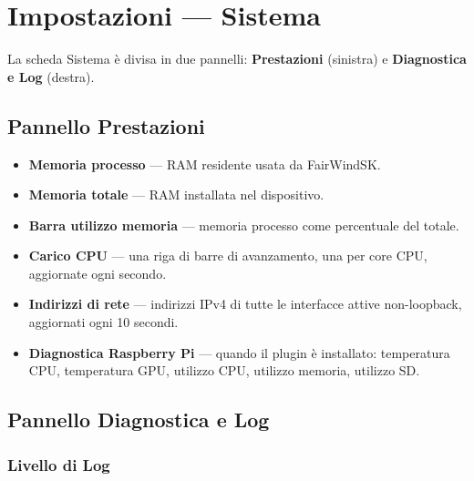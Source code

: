 \chapter{Impostazioni --- Sistema}
\label{ch:impostazioni-sistema}

La scheda Sistema è divisa in due pannelli: \textbf{Prestazioni} (sinistra) e
\textbf{Diagnostica e Log} (destra).

\section{Pannello Prestazioni}

\begin{itemize}
  \item \textbf{Memoria processo} --- RAM residente usata da FairWindSK.
  \item \textbf{Memoria totale} --- RAM installata nel dispositivo.
  \item \textbf{Barra utilizzo memoria} --- memoria processo come percentuale del totale.
  \item \textbf{Carico CPU} --- una riga di barre di avanzamento, una per core CPU,
        aggiornate ogni secondo.
  \item \textbf{Indirizzi di rete} --- indirizzi IPv4 di tutte le interfacce attive
        non-loopback, aggiornati ogni 10 secondi.
  \item \textbf{Diagnostica Raspberry Pi} --- quando il plugin
         è installato: temperatura CPU, temperatura GPU,
        utilizzo CPU, utilizzo memoria, utilizzo SD.
\end{itemize}

\section{Pannello Diagnostica e Log}

\subsection{Livello di Log}

